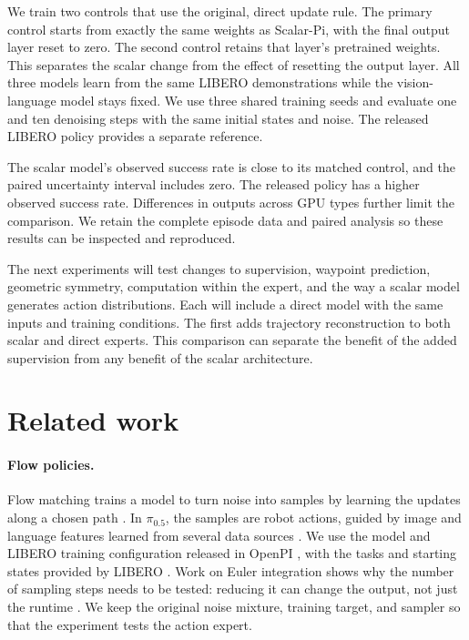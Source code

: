 \documentclass[10pt]{article}
\newcommand{\pihalf}{\pi_{0.5}}
\begin{document}
We train two controls that use the original, direct update rule. The primary control starts from exactly the same weights as Scalar-Pi, with the final output layer reset to zero. The second control retains that layer's pretrained weights. This separates the scalar change from the effect of resetting the output layer. All three models learn from the same LIBERO demonstrations while the vision-language model stays fixed. We use three shared training seeds and evaluate one and ten denoising steps with the same initial states and noise. The released LIBERO policy provides a separate reference.

The scalar model's observed success rate is close to its matched control, and the paired uncertainty interval includes zero. The released policy has a higher observed success rate. Differences in outputs across GPU types further limit the comparison. We retain the complete episode data and paired analysis so these results can be inspected and reproduced.

The next experiments will test changes to supervision, waypoint prediction, geometric symmetry, computation within the expert, and the way a scalar model generates action distributions. Each will include a direct model with the same inputs and training conditions. The first adds trajectory reconstruction to both scalar and direct experts. This comparison can separate the benefit of the added supervision from any benefit of the scalar architecture.

\section{Related work}
\paragraph{Flow policies.}
Flow matching trains a model to turn noise into samples by learning the updates along a chosen path \cite{flowmatching}. In $\pihalf$, the samples are robot actions, guided by image and language features learned from several data sources \cite{pi05}. We use the model and LIBERO training configuration released in OpenPI \cite{openpi}, with the tasks and starting states provided by LIBERO \cite{libero}. Work on Euler integration shows why the number of sampling steps needs to be tested: reducing it can change the output, not just the runtime \cite{onestep}. We keep the original noise mixture, training target, and sampler so that the experiment tests the action expert.
\end{document}
